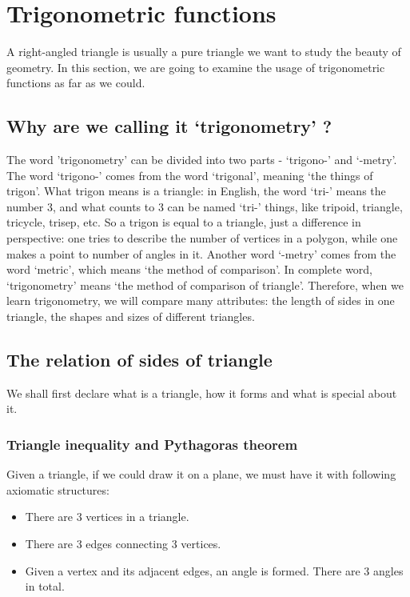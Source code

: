 \documentclass[12pt]{article}
\begin{document}
    \newpage

    \section{Trigonometric functions}

    A right-angled triangle is usually a pure triangle we want to study the beauty of geometry. In this section, we are going to examine the usage of trigonometric functions as far as we could.

    \subsection{Why are we calling it `trigonometry' ?}

    The word 'trigonometry' can be divided into two parts - `trigono-' and `-metry'. The word `trigono-' comes from the word `trigonal', meaning `the things of trigon'. What trigon means is a triangle: in English, the word `tri-' means the number 3, and what counts to 3 can be named `tri-' things, like tripoid, triangle, tricycle, trisep, etc. So a trigon is equal to a triangle, just a difference in perspective: one tries to describe the number of vertices in a polygon, while one makes a point to number of angles in it. Another word `-metry' comes from the word `metric', which means `the method of comparison'. In complete word, `trigonometry' means `the method of comparison of triangle'. Therefore, when we learn trigonometry, we will compare many attributes: the length of sides in one triangle, the shapes and sizes of different triangles.

    \subsection{The relation of sides of triangle}

    We shall first declare what is a triangle, how it forms and what is special about it.

    \subsubsection*{Triangle inequality and Pythagoras theorem}

    Given a triangle, if we could draw it on a plane, we must have it with following axiomatic structures:\begin{itemize}
        \item There are 3 vertices in a triangle.
        \item There are 3 edges connecting 3 vertices.
        \item Given a vertex and its adjacent edges, an angle is formed. There are 3 angles in total.
    \end{itemize}
\end{document}
